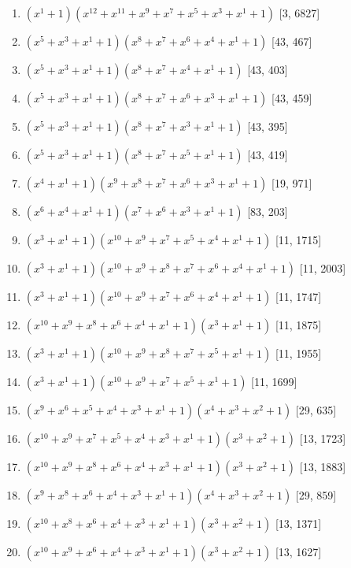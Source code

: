 \documentclass[10pt,twocolumn]{article}
\begin{document}
\begin{enumerate}
\item $(x^{1} + 1)(x^{12} + x^{11} + x^{9} + x^{7} + x^{5} + x^{3} + x^{1} + 1)$  [3, 6827]
\item $(x^{5} + x^{3} + x^{1} + 1)(x^{8} + x^{7} + x^{6} + x^{4} + x^{1} + 1)$  [43, 467]
\item $(x^{5} + x^{3} + x^{1} + 1)(x^{8} + x^{7} + x^{4} + x^{1} + 1)$  [43, 403]
\item $(x^{5} + x^{3} + x^{1} + 1)(x^{8} + x^{7} + x^{6} + x^{3} + x^{1} + 1)$  [43, 459]
\item $(x^{5} + x^{3} + x^{1} + 1)(x^{8} + x^{7} + x^{3} + x^{1} + 1)$  [43, 395]
\item $(x^{5} + x^{3} + x^{1} + 1)(x^{8} + x^{7} + x^{5} + x^{1} + 1)$  [43, 419]
\item $(x^{4} + x^{1} + 1)(x^{9} + x^{8} + x^{7} + x^{6} + x^{3} + x^{1} + 1)$  [19, 971]
\item $(x^{6} + x^{4} + x^{1} + 1)(x^{7} + x^{6} + x^{3} + x^{1} + 1)$  [83, 203]
\item $(x^{3} + x^{1} + 1)(x^{10} + x^{9} + x^{7} + x^{5} + x^{4} + x^{1} + 1)$  [11, 1715]
\item $(x^{3} + x^{1} + 1)(x^{10} + x^{9} + x^{8} + x^{7} + x^{6} + x^{4} + x^{1} + 1)$  [11, 2003]
\item $(x^{3} + x^{1} + 1)(x^{10} + x^{9} + x^{7} + x^{6} + x^{4} + x^{1} + 1)$  [11, 1747]
\item $(x^{10} + x^{9} + x^{8} + x^{6} + x^{4} + x^{1} + 1)(x^{3} + x^{1} + 1)$  [11, 1875]
\item $(x^{3} + x^{1} + 1)(x^{10} + x^{9} + x^{8} + x^{7} + x^{5} + x^{1} + 1)$  [11, 1955]
\item $(x^{3} + x^{1} + 1)(x^{10} + x^{9} + x^{7} + x^{5} + x^{1} + 1)$  [11, 1699]
\item $(x^{9} + x^{6} + x^{5} + x^{4} + x^{3} + x^{1} + 1)(x^{4} + x^{3} + x^{2} + 1)$  [29, 635]
\item $(x^{10} + x^{9} + x^{7} + x^{5} + x^{4} + x^{3} + x^{1} + 1)(x^{3} + x^{2} + 1)$  [13, 1723]
\item $(x^{10} + x^{9} + x^{8} + x^{6} + x^{4} + x^{3} + x^{1} + 1)(x^{3} + x^{2} + 1)$  [13, 1883]
\item $(x^{9} + x^{8} + x^{6} + x^{4} + x^{3} + x^{1} + 1)(x^{4} + x^{3} + x^{2} + 1)$  [29, 859]
\item $(x^{10} + x^{8} + x^{6} + x^{4} + x^{3} + x^{1} + 1)(x^{3} + x^{2} + 1)$  [13, 1371]
\item $(x^{10} + x^{9} + x^{6} + x^{4} + x^{3} + x^{1} + 1)(x^{3} + x^{2} + 1)$  [13, 1627]

\end{enumerate}
\end{document}
